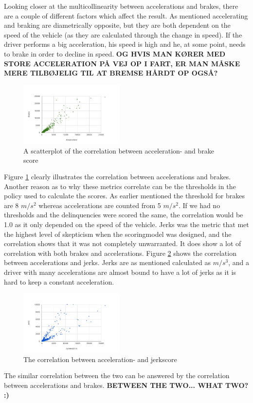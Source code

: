 Looking closer at the multicollinearity between accelerations and brakes, there are a couple of different factors which affect the result. As mentioned accelerating and braking are diametrically opposite, but they are both dependent on the speed of the vehicle (as they are calculated through the change in speed). If the driver performs a big acceleration, his speed is high and he, at some point, needs to brake in order to decline in speed. 
\textbf{OG HVIS MAN KØRER MED STORE ACCELERATION PÅ VEJ OP I FART, ER MAN MÅSKE MERE TILBØJELIG TIL AT BREMSE HÅRDT OP OGSÅ?}

\begin{figure}[tb]
\centering
\includegraphics[width=0.465\textwidth]{Pictures/abcorrel}
\caption{A scatterplot of the correlation between acceleration- and brake score}
\label{fig:abcorrel}
\end{figure}

Figure \ref{fig:abcorrel} clearly illustrates the correlation between accelerations and brakes. Another reason as to why these metrics correlate can be the thresholds in the policy used to calculate the scores. As earlier mentioned the threshold for brakes are 8 $m/s^2$ whereas accelerations are counted from 5 $m/s^2$. If we had no thresholds and the delinquencies were scored the same, the correlation would be 1.0 as it only depended on the speed of the vehicle. 
Jerks was the metric that met the highest level of skepticism when the scoringmodel was designed, and the correlation shows that it was not completely unwarranted. It does show a lot of correlation with both brakes and accelerations. Figure \ref{fig:ajcorrel} shows the correlation between accelerations and jerks. Jerks are as mentioned calculated as $m/s^3$, and a driver with many accelerations are almost bound to have a lot of jerks as it is hard to keep a constant acceleration.

\begin{figure}[tb]
\centering
\includegraphics[width=0.465\textwidth]{Pictures/ajcorrel}
\caption{The correlation between acceleration- and jerkscore}
\label{fig:ajcorrel}
\end{figure}

The similar correlation between the two can be answered by the correlation between accelerations and brakes. \textbf{BETWEEN THE TWO... WHAT TWO? :)}